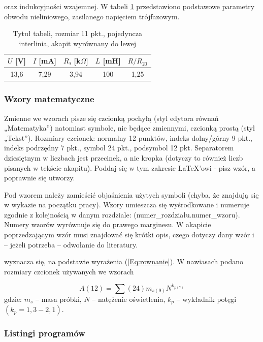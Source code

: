 \documentclass[12pt,twoside]{article}
\begin{document}
\begin{example}
	[\ldots] oraz indukcyjności wzajemnej. W tabeli \ref{Tab:tabela} przedstawiono podstawowe parametry obwodu nieliniowego, zasilanego napięciem trójfazowym.
\end{example}

\begin{table}[ht]
	\caption{Tytuł tabeli, rozmiar 11 pkt., pojedyncza interlinia, akapit wyrównany do lewej}
	\centering
	\begin{tabular}{|c|c|c|c|c|}
		\hline
		$U$ [V] & $I$ [mA] & $R$, [k$\Omega$] & $L$ [mH] & $R/R_{20}$ \\
		\hline
		13,6    & 7,29     & 3,94             & 100      & 1,25       \\
		\hline
	\end{tabular}

	\label{Tab:tabela}
\end{table}

{\subsubsection{Wzory matematyczne}}

Zmienne we wzorach pisze się czcionką pochyłą (styl edytora równań „Matematyka”) natomiast symbole, nie będące zmiennymi, czcionką prostą (styl „Tekst”).
Rozmiary czcionek: normalny 12 punktów, indeks dolny/górny 9 pkt., indeks podrzędny 7 pkt., symbol 24 pkt., podsymbol 12 pkt. Separatorem dziesiętnym w liczbach jest
przecinek, a nie kropka (dotyczy to również liczb pisanych w tekście akapitu). Poddaj się w tym zakresie \LaTeX'owi - pisz wzór, a poprawnie się utworzy.


Pod wzorem należy zamieścić objaśnienia użytych symboli (chyba, że znajdują się w wykazie na początku pracy). Wzory umieszcza się wyśrodkowane i numeruje zgodnie
z kolejnością w danym rozdziale: (numer\_rozdziału.numer\_wzoru). Numery wzorów wyrównuje się do prawego marginesu. W akapicie poprzedzającym wzór musi znajdować się krótki opis, czego dotyczy dany wzór i – jeżeli potrzeba – odwołanie do literatury.

\begin{example}
	[\ldots] wyznacza się, na podstawie wyrażenia (\ref{Eq:rownanie}). W nawiasach podano rozmiary czcionek używanych we wzorach
\end{example}

\begin{equation}
	A(12)={\sum}(24)m_{s(9)}N^{k_{p(7)}}
	\label{Eq:rownanie}
\end{equation}
gdzie: $m_s$ -- masa próbki, $N$ -- natężenie oświetlenia, $k_p$ -- wykładnik potęgi $(k_p=1,3-2,1)$.\\
\newpage
{\subsubsection{Listingi programów}}
\end{document}
